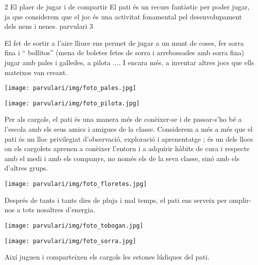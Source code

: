 
\begin{news}
{2} %
{El plaer de jugar i de compartir}
{El pati és un recurs fantàstic  per poder jugar, ja que considerem que el joc és una activitat fonamental pel desenvolupament dels nens i nenes.
}
{parvulari}
{3} %


El fet de sortir a l’aire lliure ens permet de jugar a un munt de coses, fer sorra fina i “ bollitos” (mena de boletes fetes de sorra i arrebossades amb sorra fina) jugar amb pales i galledes, a pilota .... I encara més,  a inventar altres jocs que ells mateixos van  creant.


\noindent\texttt{[image: parvulari/img/foto\_pales.jpg]}


\noindent\texttt{[image: parvulari/img/foto\_pilota.jpg]}

Per als cargols, el pati és una manera més de conèixer-se i de passar-s’ho bé a l’escola amb els seus amics i amigues de la classe.
Considerem a més a més que el pati és un lloc privilegiat d’observació, exploració i aprenentatge ; és un dels llocs on els cargolets aprenen a conèixer l’entorn i a adquirir hàbits de cura  i respecte amb el medi i amb els companys, no només els de la seva classe,  sinó amb els d’altres grups.


\noindent\texttt{[image: parvulari/img/foto\_floretes.jpg]}

Després de tants i tants dies de pluja i mal temps, el pati ens serveix per omplir-nos a tots nosaltres d’energia. 

\noindent\texttt{[image: parvulari/img/foto\_tobogan.jpg]}

\noindent\texttt{[image: parvulari/img/foto\_sorra.jpg]}


Així juguen i comparteixen els cargols les estones lúdiques del pati.



\end{news}

